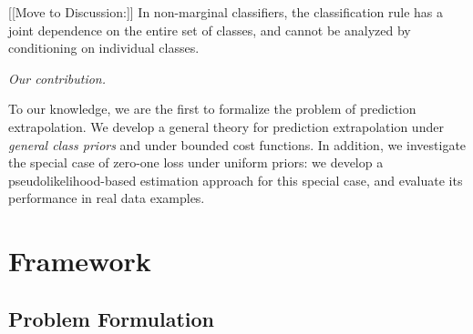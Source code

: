 \documentclass[12pt]{article}
\begin{document}
[[Move to Discussion:]]
In non-marginal classifiers, the classification rule has
a joint dependence on the entire set of classes, and cannot be
analyzed by conditioning on individual classes.
\newline

\noindent\emph{Our contribution.}

To our knowledge, we are the first to formalize the problem of
prediction extrapolation.  We develop a general theory for prediction
extrapolation under \emph{general class priors} and under bounded cost
functions.  In addition, we investigate the special case of zero-one
loss under uniform priors: we develop a pseudolikelihood-based
estimation approach for this special case, and evaluate its
performance in real data examples.







\section{Framework}\label{sec:formulation}

\subsection{Problem Formulation}

\end{document}
